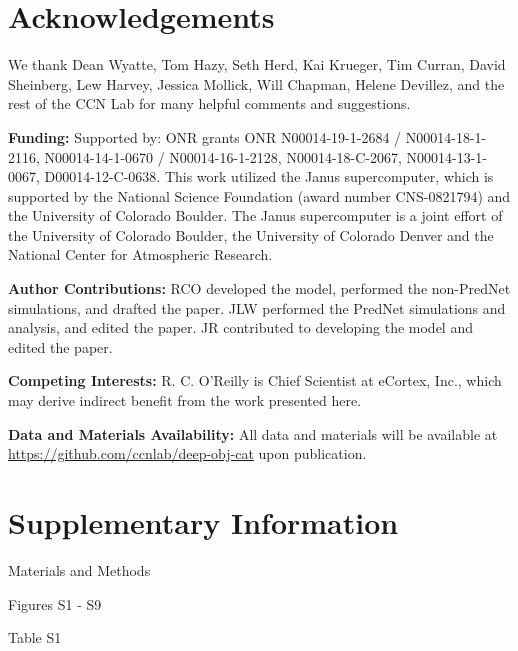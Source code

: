 \documentclass[12pt,twoside]{nature}
\newif\myifpdf
\begin{document}


\section*{Acknowledgements}

We thank Dean Wyatte, Tom Hazy, Seth Herd, Kai Krueger, Tim Curran, David Sheinberg, Lew Harvey, Jessica Mollick, Will Chapman, Helene Devillez, and the rest of the CCN Lab for many helpful comments and suggestions.

  {\bf Funding:} Supported by: ONR grants ONR N00014-19-1-2684 / N00014-18-1-2116, N00014-14-1-0670 / N00014-16-1-2128, N00014-18-C-2067, N00014-13-1-0067, D00014-12-C-0638.  This work utilized the Janus supercomputer, which is supported by the National Science Foundation (award number CNS-0821794) and the University of Colorado Boulder. The Janus supercomputer is a joint effort of the University of Colorado Boulder, the University of Colorado Denver and the National Center for Atmospheric Research.

 {\bf Author Contributions:} RCO developed the model, performed the non-PredNet simulations, and drafted the paper. JLW performed the PredNet simulations and analysis, and edited the paper.  JR contributed to developing the model and edited the paper.

  {\bf Competing Interests:} R. C. O'Reilly is Chief Scientist at eCortex, Inc., which may derive indirect benefit from the work presented here.

{\bf Data and Materials Availability:}  All data and materials will be available at \url{https://github.com/ccnlab/deep-obj-cat} upon publication.

\section*{Supplementary Information}

\noindent Materials and Methods

\noindent Figures S1 - S9

\noindent Table S1
\end{document}
